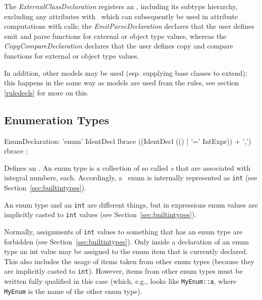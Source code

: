 The \emph{ExternalClassDeclaration} registers an , including its subtype hierarchy, excluding any attributes with \GrG~which can subsequently be used in attribute computations with  calls; the \emph{EmitParseDeclaration} declares that the user defines emit and parse functions for external or object type values, whereas the \emph{CopyCompareDeclaration} declares that the user defines copy and compare functions for external or object type values.

In addition, other models may be used (esp. supplying base classes to extend); this happens in the same way as models are used from the rules, see section \ref{ruledecls} for more on this.

\subsection{Enumeration Types}
\begin{rail}
  EnumDeclaration: 'enum' IdentDecl lbrace ((IdentDecl (() | '=' IntExpr)) + ',') rbrace ;
\end{rail}
Defines an .
An enum type is a collection of so called \emph{s} that are associated with integral numbers, each.
Accordingly, a \GrG\ enum is internally represented as \texttt{int} (see Section~\ref{sec:builtintypes}).
\begin{note}
	An enum type and an {\tt int} are different things, but in expressions enum values are implicitly casted to {\tt int} values 	(see Section~\ref{sec:builtintypes}).
\end{note}
\begin{warning}
	Normally, assignments of {\tt int} values to something that has an enum type are forbidden (see Section~\ref{sec:builtintypes}).
	Only inside a declaration of an enum type an int value may be assigned to the enum item that is currently declared.
	This also includes the usage of items taken from other enum types (because they are implicitly casted to {\tt int}).
	However, items from other enum types must be written fully qualified in this case (which, e.g., looks like {\tt MyEnum::a}, where {\tt MyEnum} is the name of the other enum type).
\end{warning}

